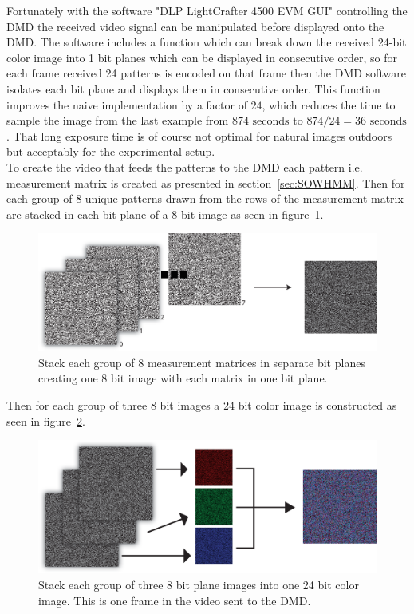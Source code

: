 Fortunately with the software "DLP LightCrafter 4500 EVM GUI" controlling the DMD the received video signal can be manipulated before displayed onto the DMD. The software includes a function which can break down the received 24-bit color image into 1 bit planes which can be displayed in consecutive order, so for each frame received 24 patterns is encoded on that frame then the DMD software isolates each bit plane and displays them in consecutive order. This function improves the naive implementation by a factor of $24$, which reduces the time to sample the image from the last example from $874 \text{ seconds to } 874/24 = 36 \text{ seconds}$. That long exposure time is of course not optimal for natural images outdoors but acceptably for the experimental setup.\\[0.1in]     


To create the video that feeds the patterns to the DMD each pattern  i.e. measurement matrix is created as presented in section~\ref{sec:SOWHMM}. Then for each group of 8 unique patterns drawn from the rows of the measurement matrix are stacked in each bit plane of a 8 bit image as seen in figure~\ref{fig:8_to_1_8}.

\begin{figure}[H]
\includegraphics[width = 1\linewidth]{gfx/DMD_12.eps}
\caption{Stack each group of 8 measurement matrices in separate  bit planes creating one 8 bit image with each matrix in one bit plane.}
	\label{fig:8_to_1_8}
\end{figure}

Then for each group of three 8 bit images a 24 bit color image is constructed as seen in figure~\ref{fig:3_8_to_1_3}. 

\begin{figure}[H]
\includegraphics[width = 1\linewidth]{gfx/DMD_2.eps}
\caption{Stack each group of three 8 bit plane images into one 24 bit color image. This is one frame in the video sent to the DMD.}
	\label{fig:3_8_to_1_3}
\end{figure}


